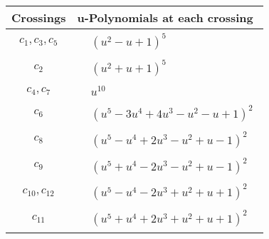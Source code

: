 \documentclass[1p]{elsarticle_modified}
\theoremstyle{definition}
\begin{document}
\begin{tabular}{m{50pt}|m{274pt}}
Crossings & \hspace{64pt}u-Polynomials at each crossing \\
\hline $$\begin{aligned}c_{1},c_{3},c_{5}\end{aligned}$$&$\begin{aligned}
&(u^2- u+1)^5
\end{aligned}$\\
\hline $$\begin{aligned}c_{2}\end{aligned}$$&$\begin{aligned}
&(u^2+u+1)^5
\end{aligned}$\\
\hline $$\begin{aligned}c_{4},c_{7}\end{aligned}$$&$\begin{aligned}
&u^{10}
\end{aligned}$\\
\hline $$\begin{aligned}c_{6}\end{aligned}$$&$\begin{aligned}
&(u^5-3 u^4+4 u^3- u^2- u+1)^2
\end{aligned}$\\
\hline $$\begin{aligned}c_{8}\end{aligned}$$&$\begin{aligned}
&(u^5- u^4+2 u^3- u^2+u-1)^2
\end{aligned}$\\
\hline $$\begin{aligned}c_{9}\end{aligned}$$&$\begin{aligned}
&(u^5+u^4-2 u^3- u^2+u-1)^2
\end{aligned}$\\
\hline $$\begin{aligned}c_{10},c_{12}\end{aligned}$$&$\begin{aligned}
&(u^5- u^4-2 u^3+u^2+u+1)^2
\end{aligned}$\\
\hline $$\begin{aligned}c_{11}\end{aligned}$$&$\begin{aligned}
&(u^5+u^4+2 u^3+u^2+u+1)^2
\end{aligned}$\\
\hline
\end{tabular}\\~\\
\end{document}
